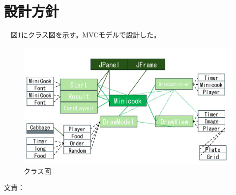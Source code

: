 \documentclass[a4j]{jarticle} %
\begin{document}
\section{設計方針}
　図1にクラス図を示す。MVCモデルで設計した。%
\begin{figure}[H]
  \begin{center}
  \includegraphics[scale=0.3]{img/class.png}
  \caption{クラス図}
  \end{center}
\end{figure}
文責：%
\end{document}
